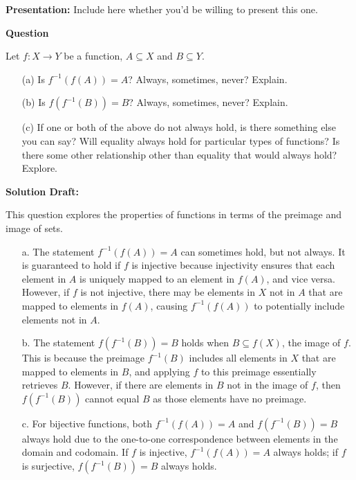 \documentclass{article}
\begin{document}
\noindent\textbf{Presentation:} Include here whether you'd be willing to present this one. 

\vspace{0.5cm} %

\noindent\textbf{Question}

Let \( f : X \to Y \) be a function, \( A \subseteq X \) and \( B \subseteq Y \).

\begin{enumerate}
    \item[(a)] Is \( f^{-1}(f(A)) = A \)? Always, sometimes, never? Explain.
    \item[(b)] Is \( f(f^{-1}(B)) = B \)? Always, sometimes, never? Explain.
    \item[(c)] If one or both of the above do not always hold, is there something else you can say? Will equality always hold for particular types of functions? Is there some other relationship other than equality that would always hold? Explore.
\end{enumerate}


\noindent\textbf{Solution Draft:} 

This question explores the properties of functions in terms of the preimage and image of sets.

\begin{enumerate}
    \item[a.]
The statement \( f^{-1}(f(A)) = A \) can sometimes hold, but not always. It is guaranteed to hold if \( f \) is injective because injectivity ensures that each element in \( A \) is uniquely mapped to an element in \( f(A) \), and vice versa. However, if \( f \) is not injective, there may be elements in \( X \) not in \( A \) that are mapped to elements in \( f(A) \), causing \( f^{-1}(f(A)) \) to potentially include elements not in \( A \).

\item[b.]
The statement \( f(f^{-1}(B)) = B \) holds when \( B \subseteq f(X) \), the image of \( f \). This is because the preimage \( f^{-1}(B) \) includes all elements in \( X \) that are mapped to elements in \( B \), and applying \( f \) to this preimage essentially retrieves \( B \). However, if there are elements in \( B \) not in the image of \( f \), then \( f(f^{-1}(B)) \) cannot equal \( B \) as those elements have no preimage.

\item[c.]
For bijective functions, both \( f^{-1}(f(A)) = A \) and \( f(f^{-1}(B)) = B \) always hold due to the one-to-one correspondence between elements in the domain and codomain. If \( f \) is injective, \( f^{-1}(f(A)) = A \) always holds; if \( f \) is surjective, \( f(f^{-1}(B)) = B \) always holds.
\end{enumerate}
\end{document}
